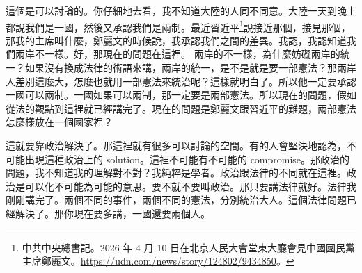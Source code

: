 \hypertarget{w05:cue:234}{}這個是可以討論的。你仔細地去看，我不知道大陸的人同不同意。大陸一天到晚上都說我們是一國，然後又承認我們是兩制。最近習近平\footnote{中共中央總書記。2026 年 4 月 10 日在北京人民大會堂東大廳會見中國國民黨主席鄭麗文。\url{https://udn.com/news/story/124802/9434850}。}說接近那個，接見那個，那我的主席叫什麼，鄭麗文的時候說，我承認我們之間的差異。我認，我認知道我們兩岸不一樣。好，那現在的問題在這裡。
\hypertarget{w05:cue:235}{}兩岸的不一樣，為什麼妨礙兩岸的統一？如果沒有換成法律的術語來講，兩岸的統一，是不是就是要一部憲法？那兩岸人差別這麼大，怎麼也就用一部憲法來統治呢？這樣就明白了。所以他一定要承認一國可以兩制。一國如果可以兩制，那一定要是兩部憲法。所以現在的問題，假如從法的觀點到這裡就已經講完了。現在的問題是鄭麗文跟習近平的難題，兩部憲法怎麼樣放在一個國家裡？

\hypertarget{w05:cue:236}{}這就要靠政治解決了。那這裡就有很多可以討論的空間。有的人會堅決地認為，不可能出現這種政治上的 solution。這裡不可能有不可能的 compromise。那政治的問題，我不知道我的理解對不對？我純粹是學者。政治跟法律的不同就在這裡。政治是可以化不可能為可能的意思。要不就不要叫政治。那只要講法律就好。法律我剛剛講完了。兩個不同的事件，兩個不同的憲法，分別統治大人。這個法律問題已經解決了。那你現在要多講，一國還要兩個人。

